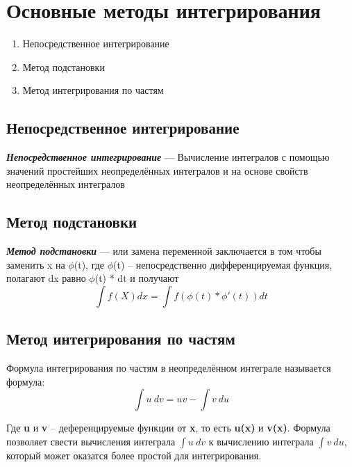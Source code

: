 \documentclass[a4paper]{article}
\begin{document}
	\section{Основные методы интегрирования}
	\begin{enumerate}
		\item Непосредственное интегрирование 
		\item Метод подстановки
		\item Метод интегрирования по частям 
	\end{enumerate}
	
	\subsection{Непосредственное интегрирование}
	\textbf{\textit{Непосредственное интегрирование}} --- Вычисление интегралов с помощью значений простейших неопределённых интегралов и на основе свойств неопределённых интегралов
	\subsection{Метод подстановки}
	\textbf{\textit{Метод подстановки}} --- или замена переменной заключается в том чтобы заменить x на $\phi$(t), где $\phi$(t) -- непосредственно дифференцируемая функция, полагают dx равно  $\phi$(t) * dt  и получают \[ \int f(X)dx = \int f(\phi(t)*\phi'(t))dt \]   
	\subsection{Метод интегрирования по частям}
	Формула интегрирования по частям в неопределённом интеграле называется формула:
	\[ 
		\int u\:dv = uv -\int v\:du
	\]
	\begin{itshape}
		Где \textbf{u} и \textbf{v} -- деференцируемые функции от \textbf{x}, то есть \textbf{u(x)} и \textbf{v(x)}. Формула позволяет свести вычисления интеграла\textbf{ \( \int u\:dv \)} к вычислению интеграла\textbf{ \( \int v\:du \)}, который может оказатся более простой для интегрирования.
	\end{itshape}
	
\end{document}
